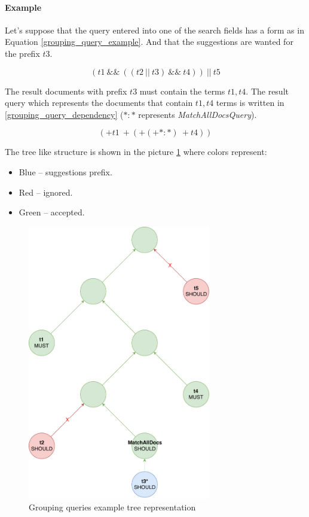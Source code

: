 \paragraph{Example}
Let's suppose that the query entered into one of the search fields has a form as in Equation \ref{grouping_query_example}.
And that the suggestions are wanted for the prefix $t3$.

\begin{equation}
\label{grouping_query_example}
(t1\ \&\&\ ((t2\ \vert\vert\ t3)\ \&\&\ t4))\ \vert\vert\ t5
\end{equation}

The result documents with prefix $t3$ must contain the terms $t1, t4$. The result query which represents the documents that
contain $t1, t4$ terms
is written in \ref{grouping_query_dependency} (${*}\colon{*}$ represents \textit{MatchAllDocsQuery}).

\begin{equation}
\label{grouping_query_dependency}
({+}t1\ {+}({+}({+}{*}\colon{*})\ {+}t4))
\end{equation}

The tree like structure is shown in the picture \ref{group_tree} where colors represent:
\begin{itemize}
    \item Blue – suggestions prefix.
    \item Red – ignored.
    \item Green – accepted.
\end{itemize}

\begin{figure}[htbp]
    \centering
    \includegraphics[width=80mm]{../img/complex_query.pdf}
    \caption{Grouping queries example tree representation}
    \label{group_tree}
\end{figure}

